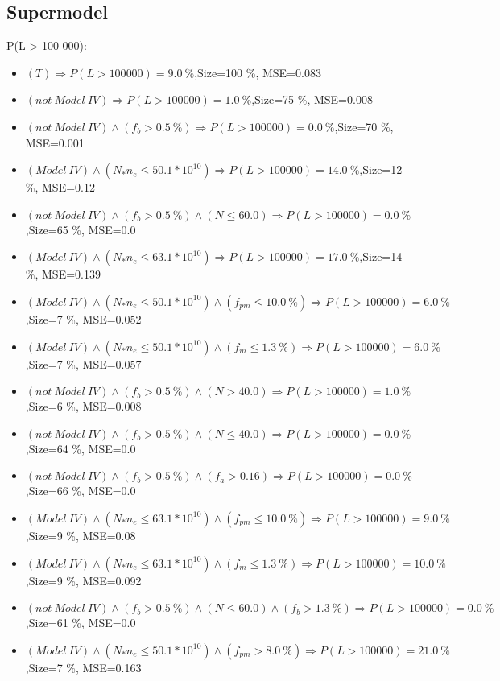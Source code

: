 \documentclass[numbered]{CSL}
\begin{document}
\subsection{Supermodel}
P(L > 100 000):
\begin{itemize}
\item $(T) \Rightarrow P(L > 100 000) = 9.0~\%$,\hfill Size=100 \%, MSE=0.083
\item $(not~Model~IV) \Rightarrow P(L > 100 000) = 1.0~\%$,\hfill Size=75 \%, MSE=0.008
\item $(not~Model~IV) \land (f_b > 0.5~\%) \Rightarrow P(L > 100 000) = 0.0~\%$,\hfill Size=70 \%, MSE=0.001
\item $(Model~IV) \land (N_* n_e \leq 50.1 * 10^{10}) \Rightarrow P(L > 100 000) = 14.0~\%$,\hfill Size=12 \%, MSE=0.12
\item $(not~Model~IV) \land (f_b > 0.5~\%) \land (N \leq 60.0) \Rightarrow P(L > 100 000) = 0.0~\%$,\hfill Size=65 \%, MSE=0.0
\item $(Model~IV) \land (N_* n_e \leq 63.1 * 10^{10}) \Rightarrow P(L > 100 000) = 17.0~\%$,\hfill Size=14 \%, MSE=0.139
\item $(Model~IV) \land (N_* n_e \leq 50.1 * 10^{10}) \land (f_{pm} \leq 10.0~\%) \Rightarrow P(L > 100 000) = 6.0~\%$,\hfill Size=7 \%, MSE=0.052
\item $(Model~IV) \land (N_* n_e \leq 50.1 * 10^{10}) \land (f_m \leq 1.3~\%) \Rightarrow P(L > 100 000) = 6.0~\%$,\hfill Size=7 \%, MSE=0.057
\item $(not~Model~IV) \land (f_b > 0.5~\%) \land (N > 40.0) \Rightarrow P(L > 100 000) = 1.0~\%$,\hfill Size=6 \%, MSE=0.008
\item $(not~Model~IV) \land (f_b > 0.5~\%) \land (N \leq 40.0) \Rightarrow P(L > 100 000) = 0.0~\%$,\hfill Size=64 \%, MSE=0.0
\item $(not~Model~IV) \land (f_b > 0.5~\%) \land (f_a > 0.16) \Rightarrow P(L > 100 000) = 0.0~\%$,\hfill Size=66 \%, MSE=0.0
\item $(Model~IV) \land (N_* n_e \leq 63.1 * 10^{10}) \land (f_{pm} \leq 10.0~\%) \Rightarrow P(L > 100 000) = 9.0~\%$,\hfill Size=9 \%, MSE=0.08
\item $(Model~IV) \land (N_* n_e \leq 63.1 * 10^{10}) \land (f_m \leq 1.3~\%) \Rightarrow P(L > 100 000) = 10.0~\%$,\hfill Size=9 \%, MSE=0.092
\item $(not~Model~IV) \land (f_b > 0.5~\%) \land (N \leq 60.0) \land (f_b > 1.3~\%) \Rightarrow P(L > 100 000) = 0.0~\%$,\hfill Size=61 \%, MSE=0.0
\item $(Model~IV) \land (N_* n_e \leq 50.1 * 10^{10}) \land (f_{pm} > 8.0~\%) \Rightarrow P(L > 100 000) = 21.0~\%$,\hfill Size=7 \%, MSE=0.163

\end{itemize}
\end{document}
